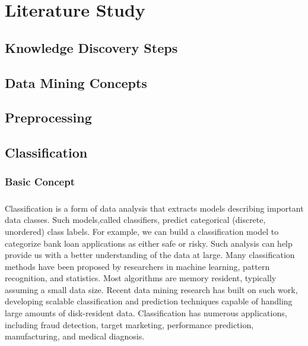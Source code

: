 
\chapter{Literature Study} %

\label{Literature Study} %




\section{Knowledge Discovery Steps}


\section{Data Mining Concepts}

\section{Preprocessing}

\section{Classification}
\subsection{Basic Concept}

\paragraph{}Classification is a form of data analysis that extracts models describing important data classes. Such models,called classifiers, predict categorical (discrete, unordered) class labels. For example, we can build a
classification model to categorize bank loan applications as either safe or risky. Such analysis can help provide
us with a better understanding of the data at large. Many classification methods have been proposed by
researchers in machine learning, pattern recognition, and statistics. Most algorithms are memory resident,
typically assuming a small data size. Recent data mining research has built on such work, developing scalable
classification and prediction techniques capable of handling large amounts of disk-resident data. Classification
has numerous applications, including fraud detection, target marketing, performance prediction, manufacturing,
and medical diagnosis.

